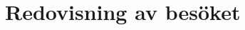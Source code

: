 \documentclass[../report.tex]{subfiles}
\begin{document}
    \chapter{Redovisning av besöket}
\end{document}
